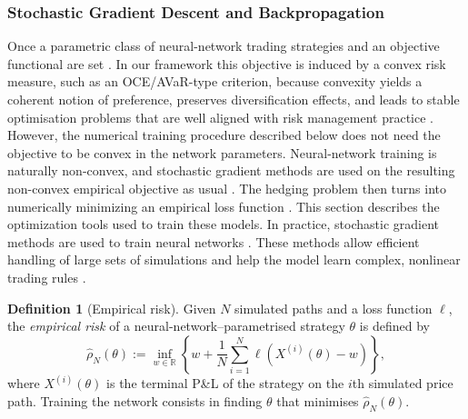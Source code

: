 \documentclass[12pt,a4paper]{article}
\theoremstyle{definition}
\newtheorem{definition}{Definition}[section]
\theoremstyle{plain}
\theoremstyle{remark}
\theoremstyle{plain}
\begin{document}
\subsubsection{Stochastic Gradient Descent and Backpropagation}

Once a parametric class of neural-network trading strategies and an objective functional are set \cite{Buehler2019DeepHedging}. 
In our framework this objective is induced by a convex risk measure, such as an OCE/AVaR-type criterion, because convexity yields a coherent notion of preference, preserves diversification effects, and leads to stable optimisation problems that are well aligned with risk management practice \cite{FoellmerSchied2016,Buehler2019DeepHedging}. 
However, the numerical training procedure described below does not need the objective to be convex in the network parameters. Neural-network training is naturally non-convex, and stochastic gradient methods are used on the resulting non-convex empirical objective as usual \cite{HighamHigham2019DeepLearning,KingmaBa2015Adam}.
The hedging problem then turns into numerically minimizing an empirical loss function \cite{HighamHigham2019DeepLearning}.
This section describes the optimization tools used to train these models.
In practice, stochastic gradient methods are used to train neural networks \cite{HighamHigham2019DeepLearning,KingmaBa2015Adam}.
These methods allow efficient handling of large sets of simulations and help the model learn complex, nonlinear trading rules \cite{Buehler2019DeepHedging,Horvath2021DeepRough}.

\begin{definition}[Empirical risk]
\label{def:empirical_risk}
Given $N$ simulated paths and a loss function $\ell$, the \emph{empirical risk} of a neural-network–parametrised strategy $\theta$ is defined by
\[
\widehat{\rho}_{N}(\theta)
    :=
    \inf_{w\in\mathbb{R}}
    \left\{
        w + \frac{1}{N}\sum_{i=1}^{N}
        \ell\!\left(X^{(i)}(\theta) - w\right)
    \right\},
\]
where $X^{(i)}(\theta)$ is the terminal P\&L of the strategy on the $i$th simulated price path.
Training the network consists in finding $\theta$ that minimises $\widehat{\rho}_{N}(\theta)$.
\end{definition}
\end{document}
